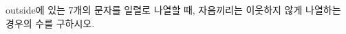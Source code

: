 \hspace*{2mm}\begin{minipage}[t]{\dimexpr\linewidth-2mm\relax}\vspace{0pt}
outside에 있는 $7$개의 문자를 일렬로 나열할 때, 자음끼리는 이웃하지 않게 나열하는 경우의 수를 구하시오.\end{minipage}
